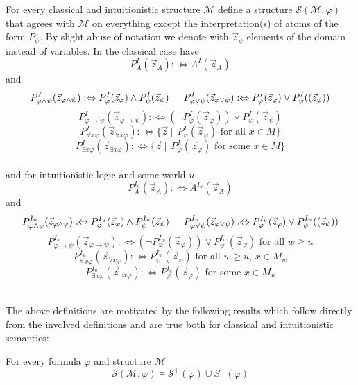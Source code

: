 \documentclass[a4paper,UKenglish,cleveref, autoref, thm-restate]{lipics-v2021}
\begin{document}
\begin{definition}
	For every classical and intuitionistic structure $\mathcal M$ define a structure $\mathcal S(\mathcal M,\varphi)$ that agrees with $\mathcal M$ on everything except the interpretation(s) of atoms of the form $P_\psi$. By slight abuse of notation we denote with $\vec z_\psi$ elements of the domain instead of variables. In the classical case have
	$$P_A^I(\vec z_A):\Leftrightarrow A^I(\vec z_A)$$
	and
	$$P_{\varphi\wedge\psi}^I(\vec z_{\varphi\wedge\psi}) :\Leftrightarrow P_{\varphi}^I(\vec z_\varphi)\wedge P_{\psi}^I(\vec z_\psi)\indent P_{\varphi\vee\psi}^I(\vec z_{\varphi\vee\psi}) :\Leftrightarrow P_{\varphi}^I(\vec z_\varphi)\vee P_{\psi}^I((\vec z_\psi))$$$$ P_{\varphi\to\psi}^I(\vec z_{\varphi\to\psi}) :\Leftrightarrow (\neg P_{\varphi}^I(\vec z_{\varphi}))\vee P_{\psi}^I(\vec z_{\psi})$$
	$$P_{\forall x\varphi}^I(\vec z_{\forall x\varphi}) :\Leftrightarrow \{\vec z\:|\:\:P_{\varphi}^I(\vec z_\varphi) \text{ for all $x\in M$}\}$$$$ P_{\exists x\varphi}^I(\vec z_{\exists x\varphi}) :\Leftrightarrow \{\vec z\:|\:\:P_{\varphi}^I(\vec z_\varphi) \text{ for some $x\in M$}\}$$
	\\
	and for intuitionistic logic and some world $u$
	$$P_A^{I_u}(\vec z_A):\Leftrightarrow A^{I_u}(\vec z_A)$$
	and
	$$P_{\varphi\wedge\psi}^{I_u}(\vec z_{\varphi\wedge\psi}) :\Leftrightarrow P_{\varphi}^{I_u}(\vec z_\varphi)\wedge P_{\psi}^{I_u}(\vec z_\psi)\indent P_{\varphi\vee\psi}^{I_u}(\vec z_{\varphi\vee\psi}) :\Leftrightarrow P_{\varphi}^{I_u}(\vec z_\varphi)\vee P_{\psi}^{I_u}((\vec z_\psi))$$$$ P_{\varphi\to\psi}^{I_u}(\vec z_{\varphi\to\psi}) :\Leftrightarrow(\neg P_{\varphi}^{I_w}(\vec z_{\varphi}))\vee P_{\psi}^{I_w}(\vec z_{\psi})\text{ for all $w\geq u$}$$
	$$P_{\forall x\varphi}^{I_u}(\vec z_{\forall x\varphi}) :\Leftrightarrow P_{\varphi}^{I_w}(\vec z_\varphi) \text{ for all $w\geq u$, $x\in M_w$}$$$$ P_{\exists x\varphi}^{I_u}(\vec z_{\exists x\varphi}) :\Leftrightarrow P_{\varphi}^{I_u}(\vec z_\varphi) \text{ for some $x\in M_u$}$$
	\\
\end{definition}

The above definitions are motivated by the following results which follow directly from the involved definitions and are true both for classical and intuitionistic semantics:

\begin{lemma}
	For every formula $\varphi$ and structure $\mathcal M$
	$$\mathcal S(\mathcal M, \varphi)\models\mathcal S^+(\varphi)\cup S^-(\varphi)$$
\end{lemma}
\end{document}
